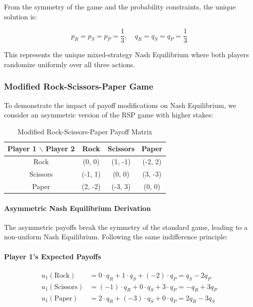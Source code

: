 \documentclass[conference]{IEEEtran}
\begin{document}
From the symmetry of the game and the probability constraints, the unique solution is:

\begin{equation}
p_R = p_S = p_P = \frac{1}{3}, \quad q_R = q_S = q_P = \frac{1}{3}
\end{equation}

This represents the unique mixed-strategy Nash Equilibrium where both players randomize uniformly over all three actions.

\subsubsection{Modified Rock-Scissors-Paper Game}

To demonstrate the impact of payoff modifications on Nash Equilibrium, we consider an asymmetric version of the RSP game with higher stakes:

\begin{table}[h!]
\centering
\caption{Modified Rock-Scissors-Paper Payoff Matrix}
\begin{tabular}{|c|c|c|c|}
\hline
Player 1 $\backslash$ Player 2 & Rock & Scissors & Paper \\
\hline
Rock & (0, 0) & (1, -1) & (-2, 2) \\
Scissors & (-1, 1) & (0, 0) & (3, -3) \\
Paper & (2, -2) & (-3, 3) & (0, 0) \\
\hline
\end{tabular}
\label{tab:modified_rsp}
\end{table}

\paragraph{Asymmetric Nash Equilibrium Derivation}

The asymmetric payoffs break the symmetry of the standard game, leading to a non-uniform Nash Equilibrium. Following the same indifference principle:

\paragraph{Player 1's Expected Payoffs}

\begin{align}
u_1(\text{Rock}) &= 0 \cdot q_R + 1 \cdot q_S + (-2) \cdot q_P = q_S - 2q_P \\
u_1(\text{Scissors}) &= (-1) \cdot q_R + 0 \cdot q_S + 3 \cdot q_P = -q_R + 3q_P \\
u_1(\text{Paper}) &= 2 \cdot q_R + (-3) \cdot q_S + 0 \cdot q_P = 2q_R - 3q_S
\end{align}
\end{document}
